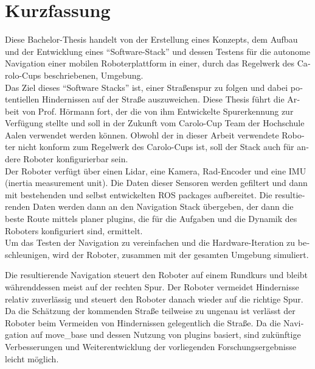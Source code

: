 \chapter*{Kurzfassung}
\label{kurzfassung}

\begin{otherlanguage}{ngerman}

Diese Bachelor-Thesis handelt von der Erstellung eines Konzepts, dem Aufbau und der Entwicklung eines ``Software-Stack'' und dessen Testens für die autonome Navigation einer mobilen Roboterplattform in einer, durch das Regelwerk des Carolo-Cups beschriebenen, Umgebung.\\

Das Ziel dieses ``Software Stacks'' ist, einer Straßenspur zu folgen und dabei potentiellen Hindernissen auf der Straße auszuweichen. Diese Thesis führt die Arbeit von Prof. Hörmann fort, der die von ihm Entwickelte Spurerkennung zur Verfügung stellte und soll in der Zukunft vom Carolo-Cup Team der Hochschule Aalen verwendet werden können. Obwohl der in dieser Arbeit verwendete Roboter nicht konform zum Regelwerk des Carolo-Cups ist, soll der Stack auch für andere Roboter konfigurierbar sein.\\

Der Roboter verfügt über einen Lidar, eine Kamera, Rad-Encoder und eine IMU (inertia measurement unit). Die Daten dieser Sensoren werden gefiltert und dann mit bestehenden und selbst entwickelten ROS packages aufbereitet. Die resultierenden Daten werden dann an den Navigation Stack  übergeben, der dann die beste Route mittels planer plugins, die für die Aufgaben und die Dynamik des Roboters konfiguriert sind, ermittelt.\\

Um das Testen der Navigation zu vereinfachen und die Hardware-Iteration zu beschleunigen, wird der Roboter, zusammen mit der gesamten Umgebung simuliert.

Die resultierende Navigation steuert den Roboter auf einem Rundkurs und bleibt währenddessen meist auf der rechten Spur. Der Roboter vermeidet Hindernisse relativ zuverlässig und steuert den Roboter danach wieder auf die richtige Spur. Da die Schätzung der kommenden Straße teilweise zu ungenau ist verlässt der Roboter beim Vermeiden von Hindernissen gelegentlich die Straße.
Da die Navigation auf move\_base und dessen Nutzung von plugins basiert, sind zukünftige Verbesserungen und Weiterentwicklung der vorliegenden Forschungsergebnisse leicht möglich.

\end{otherlanguage}
